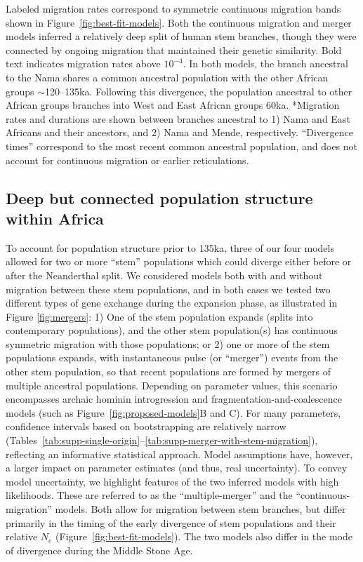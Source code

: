 \documentclass[]{article}
\begin{document}
\begin{table}[t!]
{        Labeled migration rates correspond to symmetric continuous migration
        bands shown in Figure~\ref{fig:best-fit-models}. Both the continuous migration and
        merger models inferred a relatively deep split of human stem branches,
        though they were connected by ongoing migration that maintained their
        genetic similarity. Bold text indicates migration rates above $10^{-4}$.
        In both models, the branch ancestral to the Nama shares a common ancestral population
        with the other African groups $\sim$120--135ka. Following this divergence,
        the population ancestral to other African groups branches into West and East African
        groups 60ka.
        *Migration rates and durations are shown between branches ancestral to 
        1) Nama and East Africans and their ancestors, and
        2) Nama and Mende, respectively.
        ``Divergence times'' correspond to the most recent common ancestral population,
        and does not account for continuous migration or earlier reticulations.
    }
    \label{tab:migration-rates}
\end{table}

\subsection*{Deep but connected population structure within Africa}

To account for population structure prior to 135ka, three of our four models allowed for two or more
``stem'' populations which could diverge either before or after the Neanderthal
split. We considered models both with and without migration between these stem
populations, and in both cases we tested two different types of gene exchange
during the expansion phase, as illustrated in Figure \ref{fig:mergers}:
1) One of the stem population expands (splits into
contemporary populations), and the other stem population(s) has continuous
symmetric migration with those populations; or 2) one or more of the stem
populations expands, with instantaneous pulse (or ``merger'') events from the
other stem population, so that recent populations are formed by mergers
of multiple ancestral populations. Depending on parameter values,
this scenario encompasses archaic hominin introgression and
fragmentation-and-coalescence models (such as Figure~\ref{fig:proposed-models}B and C).
For many parameters, confidence intervals based on bootstrapping are relatively narrow
(Tables~\ref{tab:supp-single-origin}--\ref{tab:supp-merger-with-stem-migration}),
reflecting an informative statistical approach. Model assumptions
have, however, a larger impact on parameter estimates (and thus, real uncertainty).
To convey model uncertainty, we highlight features of the two inferred models
with high likelihoods. These are referred to as the
``multiple-merger'' and the ``continuous-migration'' models. Both allow for
migration between stem branches, but differ primarily in the timing of the
early divergence of stem populations and their relative $N_e$
(Figure~\ref{fig:best-fit-models}). The two models also differ in the mode of divergence
during the Middle Stone Age.
\end{document}
